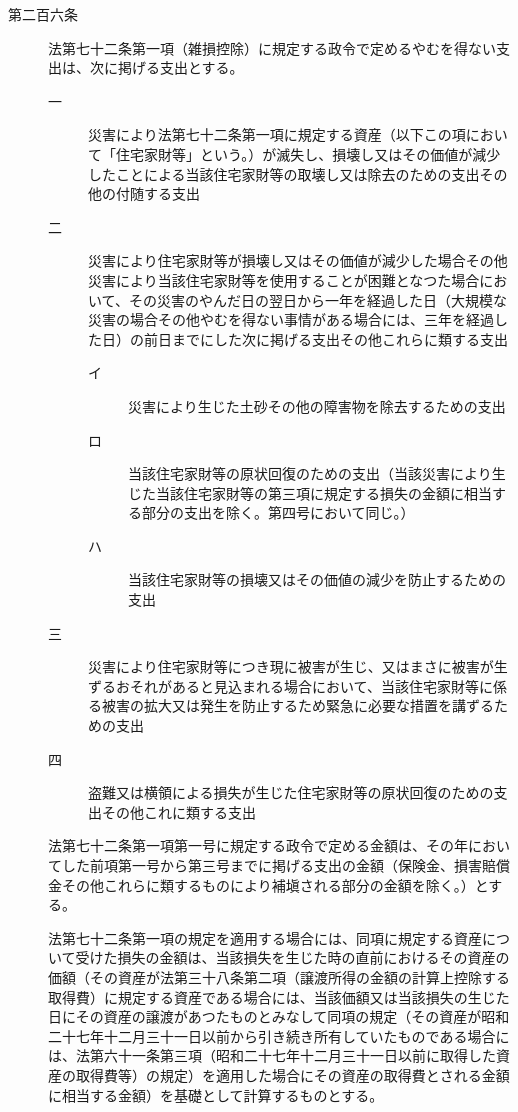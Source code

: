 \documentclass[twocolumn,a4j,10pt]{ltjtarticle}
\begin{document}
\begin{description}
\item[第二百六条]法第七十二条第一項（雑損控除）に規定する政令で定めるやむを得ない支出は、次に掲げる支出とする。
\begin{description}
\item[一]災害により法第七十二条第一項に規定する資産（以下この項において「住宅家財等」という。）が滅失し、損壊し又はその価値が減少したことによる当該住宅家財等の取壊し又は除去のための支出その他の付随する支出
\item[二]災害により住宅家財等が損壊し又はその価値が減少した場合その他災害により当該住宅家財等を使用することが困難となつた場合において、その災害のやんだ日の翌日から一年を経過した日（大規模な災害の場合その他やむを得ない事情がある場合には、三年を経過した日）の前日までにした次に掲げる支出その他これらに類する支出
\begin{description}
\item[イ]災害により生じた土砂その他の障害物を除去するための支出
\item[ロ]当該住宅家財等の原状回復のための支出（当該災害により生じた当該住宅家財等の第三項に規定する損失の金額に相当する部分の支出を除く。第四号において同じ。）
\item[ハ]当該住宅家財等の損壊又はその価値の減少を防止するための支出
\end{description}
\item[三]災害により住宅家財等につき現に被害が生じ、又はまさに被害が生ずるおそれがあると見込まれる場合において、当該住宅家財等に係る被害の拡大又は発生を防止するため緊急に必要な措置を講ずるための支出
\item[四]盗難又は横領による損失が生じた住宅家財等の原状回復のための支出その他これに類する支出
\end{description}
\item[]法第七十二条第一項第一号に規定する政令で定める金額は、その年においてした前項第一号から第三号までに掲げる支出の金額（保険金、損害賠償金その他これらに類するものにより補塡される部分の金額を除く。）とする。
\item[]法第七十二条第一項の規定を適用する場合には、同項に規定する資産について受けた損失の金額は、当該損失を生じた時の直前におけるその資産の価額（その資産が法第三十八条第二項（譲渡所得の金額の計算上控除する取得費）に規定する資産である場合には、当該価額又は当該損失の生じた日にその資産の譲渡があつたものとみなして同項の規定（その資産が昭和二十七年十二月三十一日以前から引き続き所有していたものである場合には、法第六十一条第三項（昭和二十七年十二月三十一日以前に取得した資産の取得費等）の規定）を適用した場合にその資産の取得費とされる金額に相当する金額）を基礎として計算するものとする。
\end{description}
\end{document}
